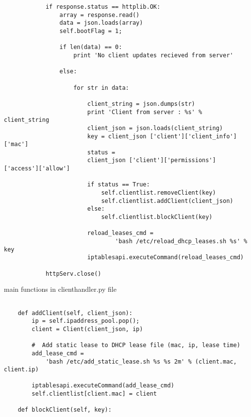\begin{appendices}
\begin{algorithm}[h]
\begin{verbatim}
            if response.status == httplib.OK:
                array = response.read()
                data = json.loads(array)
                self.bootFlag = 1;
                
                if len(data) == 0:    
                    print 'No client updates recieved from server'
                
                else:
                    
                    for str in data:
                    
                        client_string = json.dumps(str)
                        print 'Client from server : %s' % client_string
                        client_json = json.loads(client_string)
                        key = client_json ['client']['client_info']['mac']
                        status = 
                        client_json ['client']['permissions']['access']['allow']
	
                        if status == True:
                        	self.clientlist.removeClient(key)
                        	self.clientlist.addClient(client_json)
                    	else:
                    		self.clientlist.blockClient(key)				

                        reload_leases_cmd = 
                        		'bash /etc/reload_dhcp_leases.sh %s' % key 
                        iptablesapi.executeCommand(reload_leases_cmd)
                
            httpServ.close()

 \end{verbatim}
\end{algorithm}

\begin{algorithm}[h]
  \caption{main functions in clienthandler.py file}
  \label{code:clienthandler_py}
  \begin{verbatim}

    def addClient(self, client_json):      
        ip = self.ipaddress_pool.pop();
        client = Client(client_json, ip)
        
        #  Add static lease to DHCP lease file (mac, ip, lease time)
        add_lease_cmd = 
        	'bash /etc/add_static_lease.sh %s %s 2m' % (client.mac, client.ip)
        
        iptablesapi.executeCommand(add_lease_cmd)
        self.clientlist[client.mac] = client

    def blockClient(self, key):


\end{verbatim}
\end{algorithm}
\end{appendices}
